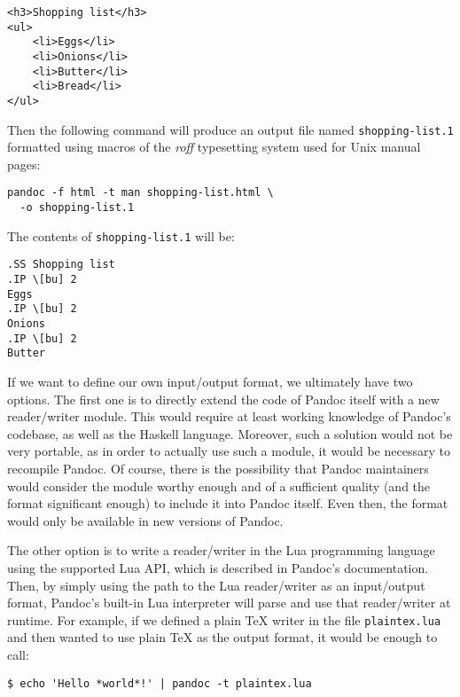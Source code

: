 \documentclass[
  digital,     %
  oneside,     %
  nosansbold,  %
  nocolorbold, %
  lof,         %
  nolot,       %
]{fithesis4}
\begin{document}
\noindent
\lstset{language=HTML}
\begin{lstlisting}
<h3>Shopping list</h3>
<ul>
    <li>Eggs</li>
    <li>Onions</li>
    <li>Butter</li>
    <li>Bread</li>
</ul>
\end{lstlisting}

\noindent
Then the following command will produce an output file named \texttt{shopping-list.1} formatted using macros of the \textit{roff} typesetting system used for Unix manual pages:

\noindent
\lstset{language=}
\begin{lstlisting}
pandoc -f html -t man shopping-list.html \
  -o shopping-list.1
\end{lstlisting}

\noindent
The contents of \texttt{shopping-list.1} will be:

\noindent
\begin{lstlisting}
.SS Shopping list
.IP \[bu] 2
Eggs
.IP \[bu] 2
Onions
.IP \[bu] 2
Butter
\end{lstlisting}

\noindent
If we want to define our own input/output format, we ultimately have two options. The first one is to directly extend the code of Pandoc itself with a new reader/writer module. This would require at least working knowledge of Pandoc's codebase, as well as the Haskell language. Moreover, such a solution would not be very portable, as in order to actually use such a module, it would be necessary to recompile Pandoc. Of course, there is the possibility that Pandoc maintainers would consider the module worthy enough and of a sufficient quality (and the format significant enough) to include it into Pandoc itself. Even then, the format would only be available in new versions of Pandoc.

The other option is to write a reader/writer in the Lua programming language \cite{lua-pil} using the supported Lua API, which is described in Pandoc's documentation. \cite{pandoc-writers} Then, by simply using the path to the Lua reader/writer as an input/output format, Pandoc's built-in Lua interpreter will parse and use that reader/writer at runtime. For example, if we defined a plain \TeX{} writer in the file \texttt{plaintex.lua} and then wanted to use plain \TeX{} as the output format, it would be enough to call:

\noindent
\begin{lstlisting}
$ echo 'Hello *world*!' | pandoc -t plaintex.lua
\end{lstlisting}
\end{document}
